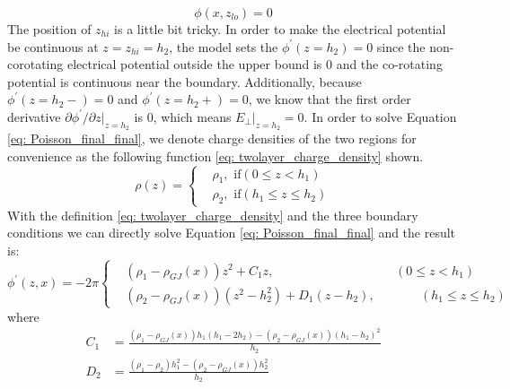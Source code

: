 \documentclass[12pt]{report}
\begin{document}
      \begin{equation}
        \label{eq: lower_boundary}
        \phi \left(x, z_{lo}\right) = 0
      \end{equation}
      The position of $z_{hi}$ is a little bit tricky. In order to make the electrical potential be 
      continuous at $z = z_{hi} = h_2$, the model sets the $\phi^{\prime}\left(z=h_{2}\right) = 0$ since the 
      non-corotating electrical potential outside the upper bound is $0$ and the co-rotating potential
      is continuous near the boundary. Additionally, because $\phi^{\prime}\left(z=h_{2}-\right) = 0$
      and $\phi^{\prime}\left(z=h_{2}+\right) = 0$, we know that the first order derivative 
      $\partial{\phi^{\prime}}/\partial{z}\vert_{z=h_{2}}$ is $0$, which means 
      $E_{\perp}\vert_{z=h_{2}} = 0$. 
      In order to solve Equation \ref{eq: Poisson_final_final}, we denote charge densities of
      the two regions for convenience as the following function 
      \ref{eq: twolayer_charge_density} shown.
      \begin{equation}
        \label{eq: twolayer_charge_density}
          \rho\left(z\right) = 
          \begin{cases}
             & \rho_{1} , \text{    if} \left(0 \leq z < h_{1}\right)\\
             & \rho_{2} , \text{    if} \left(h_{1} \leq z \leq h_{2}\right) 
          \end{cases}       
      \end{equation}
      With the definition \ref{eq: twolayer_charge_density} and the three boundary conditions
      we can directly solve Equation \ref{eq: Poisson_final_final} and the result is:
      \begin{equation}
        \label{eq: twolayer_potential}
          \phi^{\prime}\left(z, x\right) = -2\pi
          \left\{\begin{alignedat}{2}
             & \left(\rho_{1} - \rho_{GJ}\left(x\right)\right)z^2 + C_{1} z ,  &&\left(0 \leq z < h_{1}\right)\\
             & \left(\rho_{2}-\rho_{GJ}\left(x\right)\right)\left(z^2 - h_2^2\right) + D_{1} \left(z-h_2\right),  &&\qquad \left(h_{1} \leq z \leq h_{2}\right) 
          \end{alignedat}\right.
      \end{equation}
      where 
      \begin{align*}
        C_{1} &= \frac{\left(\rho_{1}-\rho_{GJ}\left(x\right)\right)h_1\left(h_1-2h_2\right)-\left(\rho_2-\rho_{GJ}\left(x\right)\right)\left(h_1-h_2\right)^2}{h_2} \\
        D_{2} &= \frac{\left(\rho_1-\rho_2\right)h_1^2-\left(\rho_2-\rho_{GJ}\left(x\right)\right)h_2^2}{h_2}
      \end{align*}
\end{document}
